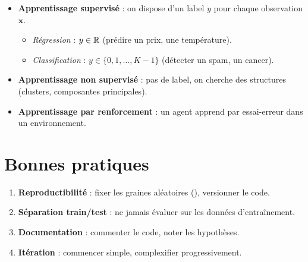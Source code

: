 \begin{center}
\end{center}

\begin{itemize}
\item \textbf{Apprentissage supervis\'e} : on dispose d'un label $y$ pour chaque observation $\bm{x}$.
  \begin{itemize}
  \item \emph{R\'egression} : $y \in \mathbb{R}$ (pr\'edire un prix, une temp\'erature).
  \item \emph{Classification} : $y \in \{0,1,\ldots,K-1\}$ (d\'etecter un spam, un cancer).
  \end{itemize}
\item \textbf{Apprentissage non supervis\'e} : pas de label, on cherche des structures (clusters, composantes principales).
\item \textbf{Apprentissage par renforcement} : un agent apprend par essai-erreur dans un environnement.
\end{itemize}

\section{Bonnes pratiques}

\begin{bonnepratique}
\begin{enumerate}
\item \textbf{Reproductibilit\'e} : fixer les graines al\'eatoires (), versionner le code.
\item \textbf{S\'eparation train/test} : ne jamais \'evaluer sur les donn\'ees d'entra\^inement.
\item \textbf{Documentation} : commenter le code, noter les hypoth\`eses.
\item \textbf{It\'eration} : commencer simple, complexifier progressivement.
\end{enumerate}
\end{bonnepratique}

